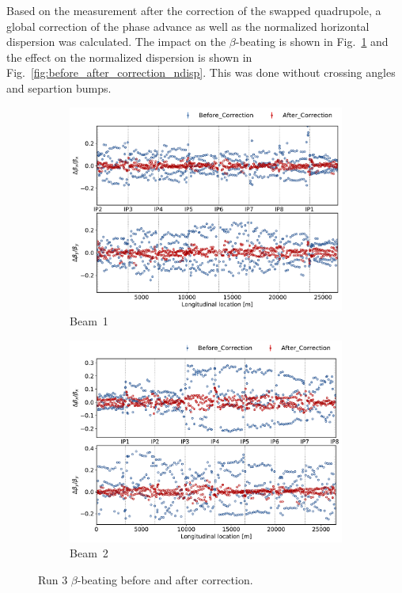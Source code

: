 \documentclass[a4paper]{cernatsnote}
\begin{document}
Based on the measurement after the correction of the swapped quadrupole, a global correction of the phase advance as well as the normalized horizontal dispersion was calculated. The impact on the $\beta$-beating is shown in Fig.~\ref{fig:before_after_correction_beta_beat} and the effect on the normalized dispersion is shown in Fig.~\ref{fig:before_after_correction_ndisp}. This was done without crossing angles and separtion bumps. 

\begin{figure}[ht]
\begin{subfigure}{.5\textwidth}
  \centering
  \includegraphics[width=.99\linewidth]{plots/beam1/beta_beat_before_and_after_corr.pdf}  
  \caption{Beam~1}
\end{subfigure}
\begin{subfigure}{.5\textwidth}
  \centering
  \includegraphics[width=.99\linewidth]{plots/beam2/beta_beat_before_after_correction.pdf}  
  \caption{Beam~2}
\end{subfigure}
\caption{Run 3 $\beta$-beating before and after correction.}
\label{fig:before_after_correction_beta_beat}
\end{figure}
\end{document}
